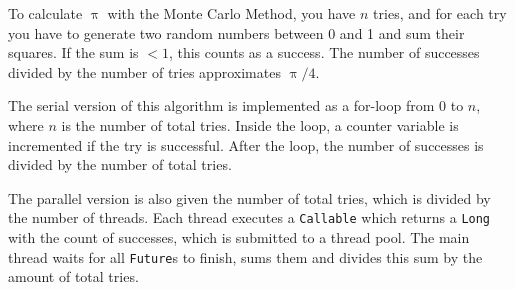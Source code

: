 \documentclass{article}
\begin{document}
  To calculate $\uppi$ with the Monte Carlo Method, you have $n$ tries, and for each try you have to generate two random numbers between 0 and 1 and sum their squares. If the sum is $< 1$, this counts as a success. The number of successes divided by the number of tries approximates $\uppi / 4$.

  The serial version of this algorithm is implemented as a for-loop from $0$ to $n$, where $n$ is the number of total tries. Inside the loop, a counter variable is incremented if the try is successful. After the loop, the number of successes is divided by the number of total tries.

  The parallel version is also given the number of total tries, which is divided by the number of threads. Each thread executes a \texttt{Callable} which returns a \texttt{Long} with the count of successes, which is submitted to a thread pool. The main thread waits for all \texttt{Future}s to finish, sums them and divides this sum by the amount of total tries.
\end{document}
